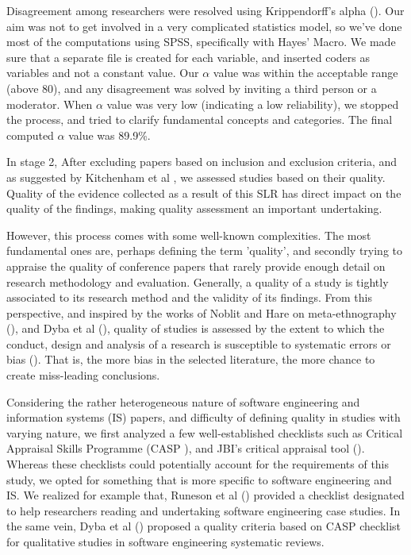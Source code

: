 \documentclass{ieeeaccess}
\begin{document}
Disagreement among researchers were resolved using Krippendorff’s alpha (\cite{krippendorff2011computing}). Our aim was not to get involved in a very complicated statistics model, so we've done most of the computations using SPSS, specifically with Hayes’ Macro. We made sure that a separate file is created for each variable, and inserted coders as variables and not a constant value. Our $ \alpha $ value was within the acceptable range (above 80), and any disagreement was solved by inviting a third person or a moderator. When $ \alpha $ value was very low (indicating a low reliability), we stopped the process, and tried to clarify fundamental concepts and categories. The final computed $ \alpha $ value was 89.9\%. 

In stage 2, After excluding papers based on inclusion and exclusion criteria, and as suggested by Kitchenham et al \cite{kitchenham2015evidence}, we assessed studies based on their quality. Quality of the evidence collected as a result of this SLR has direct impact on the quality of the findings, making quality assessment an important undertaking.

However, this process comes with some well-known complexities. The most fundamental ones are, perhaps defining the term 'quality', and secondly trying to appraise the quality of conference papers that rarely provide enough detail on research methodology and evaluation. Generally, a quality of a study is tightly associated to its research method and the validity of its findings. From this perspective, and inspired by the works of Noblit and Hare on meta-ethnography (\cite{noblit1988meta}), and Dyba et al (\cite{dybaa2008empirical}), quality of studies is assessed by the extent to which the conduct, design and analysis of a research is susceptible to systematic errors or bias (\cite{cumpston2019updated}). That is, the more bias in the selected literature, the more chance to create miss-leading conclusions.

Considering the rather heterogeneous nature of software engineering and information systems (IS) papers, and difficulty of defining quality in studies with varying nature, we first analyzed a few well-established checklists such as Critical Appraisal Skills Programme (CASP \cite{CASP}), and JBI's critical appraisal tool (\cite{JBI}). Whereas these checklists could potentially account for the requirements of this study, we opted for something that is more specific to software engineering and IS. We realized for example that, Runeson et al (\cite{runeson2006we}) provided a checklist designated to help researchers reading and undertaking software engineering case studies. In the same vein, Dyba et al (\cite{dybaa2008empirical}) proposed a quality criteria based on CASP checklist for qualitative studies in software engineering systematic reviews. 
\end{document}
